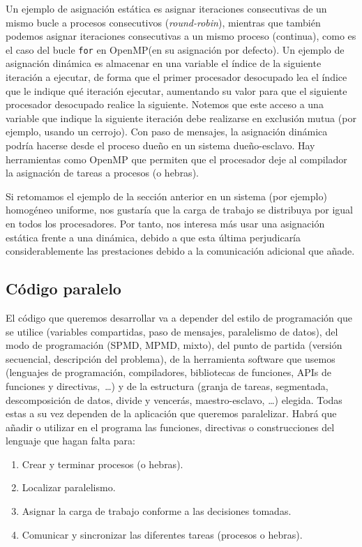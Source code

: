 Un ejemplo de asignación estática es asignar iteraciones consecutivas de un mismo bucle a procesos consecutivos (\textit{round-robin}), mientras que también podemos asignar iteraciones consecutivas a un mismo proceso (continua), como es el caso del bucle \verb|for| en OpenMP\@ (en su asignación por defecto). Un ejemplo de asignación dinámica es almacenar en una variable el índice de la siguiente iteración a ejecutar, de forma que el primer procesador desocupado lea el índice que le indique qué iteración ejecutar, aumentando su valor para que el siguiente procesador desocupado realice la siguiente. Notemos que este acceso a una variable que indique la siguiente iteración debe realizarse en exclusión mutua (por ejemplo, usando un cerrojo). Con paso de mensajes, la asignación dinámica podría hacerse desde el proceso dueño en un sistema dueño-esclavo. Hay herramientas como OpenMP que permiten que el procesador deje al compilador la asignación de tareas a procesos (o hebras).

\begin{ejemplo}
    Si retomamos el ejemplo de la sección anterior en un sistema (por ejemplo) homogéneo uniforme, nos gustaría que la carga de trabajo se distribuya por igual en todos los procesadores. Por tanto, nos interesa más usar una asignación estática frente a una dinámica, debido a que esta última perjudicaría considerablemente las prestaciones debido a la comunicación adicional que añade.
\end{ejemplo}
\subsection{Código paralelo}
El código que queremos desarrollar va a depender del estilo de programación que se utilice (variables compartidas, paso de mensajes, paralelismo de datos), del modo de programación (SPMD, MPMD, mixto), del punto de partida (versión secuencial, descripción del problema), de la herramienta software que usemos (lenguajes de programación, compiladores, bibliotecas de funciones, APIs de funciones y directivas,~\ldots) y de la estructura (granja de tareas, segmentada, descomposición de datos, divide y vencerás, maestro-esclavo, \ldots) elegida. Todas estas a su vez dependen de la aplicación que queremos paralelizar.
Habrá que añadir o utilizar en el programa las funciones, directivas o construcciones del lenguaje que hagan falta para:
\begin{enumerate}
    \item Crear y terminar procesos (o hebras).
    \item Localizar paralelismo.
    \item Asignar la carga de trabajo conforme a las decisiones tomadas.
    \item Comunicar y sincronizar las diferentes tareas (procesos o hebras).
\end{enumerate}

